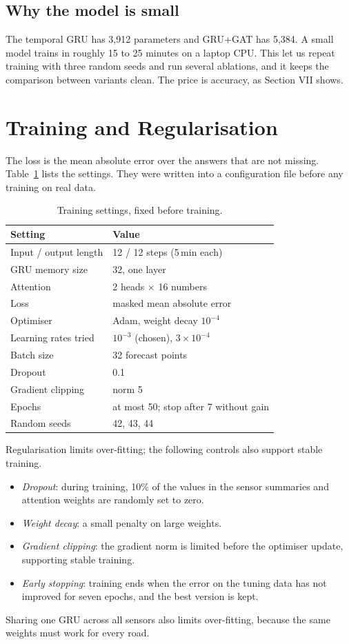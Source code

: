 \documentclass[conference]{IEEEtran}
\begin{document}
\subsection{Why the model is small}
The temporal GRU has 3,912 parameters and GRU+GAT has 5,384. A small model trains in roughly 15 to 25 minutes on a laptop CPU. This let us repeat training with three random seeds and run several ablations, and it keeps the comparison between variants clean. The price is accuracy, as Section VII shows.

\section{Training and Regularisation}
The loss is the mean absolute error over the answers that are not missing. Table~\ref{tab:hyper} lists the settings. They were written into a configuration file before any training on real data.

\begin{table}[t]\centering\small
\caption{Training settings, fixed before training.}\label{tab:hyper}
\begin{tabular}{@{}ll@{}}\toprule
Setting & Value\\\midrule
Input / output length & 12 / 12 steps (5\,min each)\\
GRU memory size & 32, one layer\\
Attention & 2 heads $\times$ 16 numbers\\
Loss & masked mean absolute error\\
Optimiser & Adam, weight decay $10^{-4}$\\
Learning rates tried & $10^{-3}$ (chosen), $3\times10^{-4}$\\
Batch size & 32 forecast points\\
Dropout & 0.1\\
Gradient clipping & norm 5\\
Epochs & at most 50; stop after 7 without gain\\
Random seeds & 42, 43, 44\\
\bottomrule\end{tabular}
\end{table}

Regularisation limits over-fitting; the following controls also support stable training.
\begin{itemize}
\item \emph{Dropout}: during training, 10\% of the values in the sensor summaries and attention weights are randomly set to zero.
\item \emph{Weight decay}: a small penalty on large weights.
\item \emph{Gradient clipping}: the gradient norm is limited before the optimiser update, supporting stable training.
\item \emph{Early stopping}: training ends when the error on the tuning data has not improved for seven epochs, and the best version is kept.
\end{itemize}
Sharing one GRU across all sensors also limits over-fitting, because the same weights must work for every road.
\end{document}
